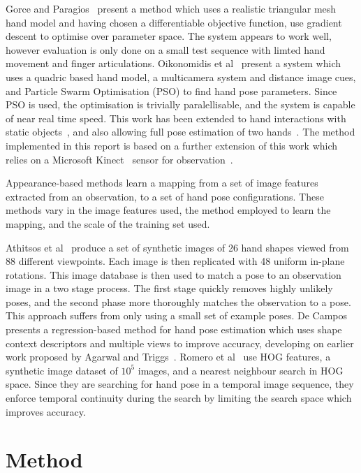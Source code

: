 \documentclass[10pt,a4paper,notitlepage,twocolumn]{report}
\begin{document}
Gorce and Paragios~\cite{de2008model} present a method which uses a realistic 
triangular mesh hand model and having chosen a differentiable objective 
function, use gradient descent to optimise over parameter space.  The system 
appears to work well, however evaluation is only done on a small test sequence 
with limted hand movement and finger articulations.  Oikonomidis et 
al~\cite{oikonomidis2011markerless} present a system which uses a quadric based 
hand model, a multicamera system and distance image cues, and Particle Swarm 
Optimisation (PSO) to find hand pose parameters.  Since PSO is used, the 
optimisation is trivially paralellisable, and the system is capable of near real 
time speed.  This work has been extended to hand interactions with static 
objects~\cite{oikonomidis2011}, and also allowing full pose estimation of two 
hands~\cite{oikonomidis2012}.  The method implemented in this report is based on 
a further extension of this work which relies on a Microsoft 
Kinect~\cite{kinect} sensor for observation~\cite{bmvc2011oikonom}.

Appearance-based methods learn a mapping from a set of image features extracted 
from an observation, to a set of hand pose configurations.  These methods vary 
in the image features used, the method employed to learn the mapping, and the 
scale of the training set used.  

Athitsos et al~\cite{athitsos2003estimating} produce a set of synthetic images 
of 26 hand shapes viewed from 88 different viewpoints.  Each image is then 
replicated with 48 uniform in-plane rotations.  This image database is then used 
to match a pose to an observation image in a two stage process.  The first stage 
quickly removes highly unlikely poses, and the second phase more thoroughly 
matches the observation to a pose.  This approach suffers from only using a 
small set of example poses.  De Campos~\cite{de2006regression} presents a 
regression-based method for hand pose estimation which uses shape context 
descriptors and multiple views to improve accuracy, developing on earlier work 
proposed by Agarwal and Triggs~\cite{agarwal2006recovering}.  Romero et 
al~\cite{romero2009monocular} use HOG features, a synthetic image dataset of 
$10^5$ images, and a nearest neighbour search in HOG space.  Since they are 
searching for hand pose in a temporal image sequence, they enforce temporal 
continuity during the search by limiting the search space which improves 
accuracy.

\section{Method}
\end{document}
